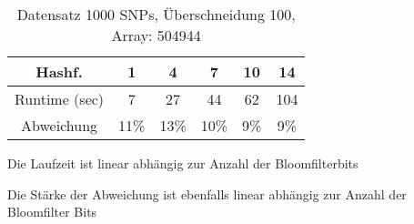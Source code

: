 \documentclass{beamer}
\begin{document}
\begin{frame}
	\begin{table}[h]
		
		\begin{tabular}{c|c|c|c|c|c}
			Hashf.&1&4&7&10&14\\
			\hline
			Runtime (sec)&7&27&44&62&104\\
			Abweichung&11\%&13\%&10\%&9\%&9\%\\
			
			
		\end{tabular}
		\caption{Datensatz 1000 SNPs, Überschneidung 100, Array: 504944 }
		\label{tab:meinetabelle4}
	\end{table}
	
	\begin{arrowlist}
		\item Die Laufzeit ist linear abhängig zur Anzahl der Bloomfilterbits
		\item Die Stärke der Abweichung ist ebenfalls linear abhängig zur Anzahl der Bloomfilter Bits
	\end{arrowlist}
\end{frame}
\end{document}
